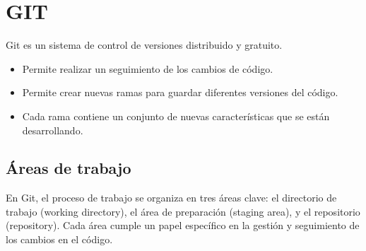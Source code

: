 \section{GIT}


Git es un sistema de control de versiones distribuido y gratuito.
\begin{itemize}
    \item Permite realizar un seguimiento de los cambios de código.
    \item Permite crear nuevas ramas para guardar diferentes versiones del código.
    \item Cada rama contiene un conjunto de nuevas características que se están desarrollando.
\end{itemize}

\subsection{Áreas de trabajo}

En Git, el proceso de trabajo se organiza en tres áreas clave: el directorio de trabajo (working
 directory), el área de preparación (staging area), y el repositorio (repository). Cada área 
 cumple un papel específico en la gestión y seguimiento de los cambios en el código.

